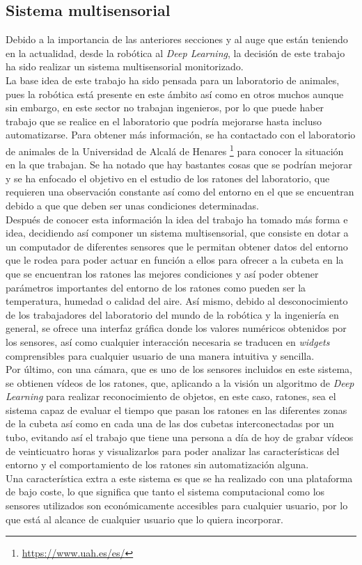 \subsection{Sistema multisensorial}
Debido a la importancia de las anteriores secciones y al auge que están teniendo en la actualidad, desde la robótica al \textit{Deep Learning}, la decisión de este trabajo ha sido realizar un sistema multisensorial monitorizado.\\
La base idea de este trabajo ha sido pensada para un laboratorio de animales, pues la robótica está presente en este ámbito así como en otros muchos aunque sin embargo, en este sector no trabajan ingenieros, por lo que puede haber trabajo que se realice en el laboratorio que podría mejorarse hasta incluso automatizarse. Para obtener más información, se ha contactado con el laboratorio de animales de la Universidad de Alcalá de Henares \footnote{\url{https://www.uah.es/es/}}  para conocer la situación en la que trabajan. Se ha notado que hay bastantes cosas que se podrían mejorar y se ha enfocado el objetivo en el estudio de los ratones del laboratorio, que requieren una observación constante así como del entorno en el que se encuentran debido a que que deben ser unas condiciones determinadas.\\
Después de conocer esta información la idea del trabajo ha tomado más forma e idea, decidiendo así componer un sistema multisensorial, que consiste en dotar a un computador de diferentes sensores que le permitan obtener datos del entorno que le rodea para poder actuar en función a ellos para ofrecer a la cubeta en la que se encuentran los ratones las mejores condiciones y así poder obtener parámetros importantes del entorno de los ratones como pueden ser la temperatura, humedad o calidad del aire. Así mismo, debido al desconocimiento de los trabajadores del laboratorio del mundo de la robótica y la ingeniería en general, se ofrece una interfaz gráfica donde los valores numéricos obtenidos por los sensores, así como cualquier interacción necesaria se traducen en \textit{widgets} comprensibles para cualquier usuario de una manera intuitiva y sencilla.\\
Por último, con una cámara, que es uno de los sensores incluidos en este sistema, se obtienen vídeos de los ratones, que, aplicando a la visión un algoritmo de \textit{Deep Learning} para realizar reconocimiento de objetos, en este caso, ratones, sea el sistema capaz de evaluar el tiempo que pasan los ratones en las diferentes zonas de la cubeta así como en cada una de las dos cubetas interconectadas por un tubo, evitando así el trabajo que tiene una persona a día de hoy de grabar vídeos de veinticuatro horas y visualizarlos para poder analizar las características del entorno y el comportamiento de los ratones sin automatización alguna.\\
Una característica extra a este sistema es que se ha realizado con una plataforma de bajo coste, lo que significa que tanto el sistema computacional como los sensores utilizados son económicamente accesibles para cualquier usuario, por lo que está al alcance de cualquier usuario que lo quiera incorporar.\\

